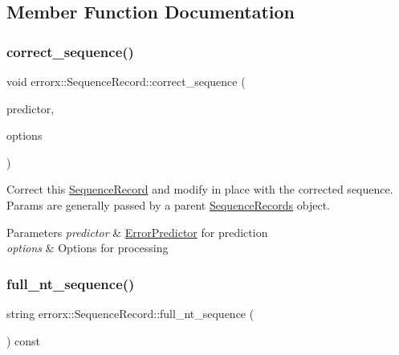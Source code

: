 \subsection{Member Function Documentation}
\mbox{\label{classerrorx_1_1_sequence_record_af399cf58824831f8e12247a64108a925}} 
\subsubsection{\texorpdfstring{correct\+\_\+sequence()}{correct\_sequence()}}
{\footnotesize\ttfamily void errorx\+::\+Sequence\+Record\+::correct\+\_\+sequence (\begin{DoxyParamCaption}\item[{\mbox{\hyperlink{classerrorx_1_1_error_predictor}{Error\+Predictor}} const \&}]{predictor,  }\item[{\mbox{\hyperlink{classerrorx_1_1_error_x_options}{Error\+X\+Options}} const \&}]{options }\end{DoxyParamCaption})}

Correct this \mbox{\hyperlink{classerrorx_1_1_sequence_record}{Sequence\+Record}} and modify in place with the corrected sequence. Params are generally passed by a parent \mbox{\hyperlink{classerrorx_1_1_sequence_records}{Sequence\+Records}} object.


\begin{DoxyParams}{Parameters}
{\em predictor} & \mbox{\hyperlink{classerrorx_1_1_error_predictor}{Error\+Predictor}} for prediction \\
\hline
{\em options} & Options for processing \\
\hline
\end{DoxyParams}
\mbox{\label{classerrorx_1_1_sequence_record_a904548a440ad3da0f4386f55ec7b6eac}} 
\subsubsection{\texorpdfstring{full\+\_\+nt\+\_\+sequence()}{full\_nt\_sequence()}}
{\footnotesize\ttfamily string errorx\+::\+Sequence\+Record\+::full\+\_\+nt\+\_\+sequence (\begin{DoxyParamCaption}{ }\end{DoxyParamCaption}) const}

